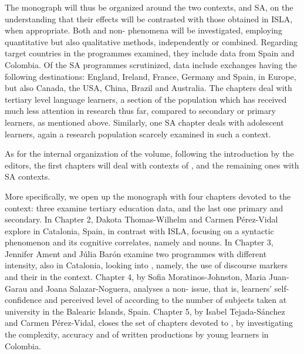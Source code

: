 \documentclass[output=paper]{langsci/langscibook}
\begin{document}
The monograph will thus be organized around the two contexts,  and SA, on the understanding that their effects will be contrasted with those obtained in ISLA, when appropriate. Both  and non- phenomena will be investigated, employing quantitative but also qualitative methods, independently or combined. Regarding target countries in the  programmes examined, they include data from Spain and Colombia. Of the SA programmes scrutinized, data include exchanges having the following destinations: England, Ireland, France, Germany and Spain, in Europe, but also Canada, the USA, China, Brazil and Australia. The  chapters deal with tertiary level language learners, a section of the population which has received much less attention in research thus far, compared to secondary or primary learners, as mentioned above. Similarly, one SA chapter deals with adolescent learners, again a research population scarcely examined in such a context.

\largerpage
As for the internal organization of the volume, following the introduction by the editors, the first chapters will deal with  contexts of , and the remaining ones with SA contexts. 


More specifically, we open up the monograph with four chapters devoted to the  context: three examine tertiary education data, and the last one primary and secondary. In Chapter 2, Dakota Thomas-Wilhelm and Carmen Pérez-Vidal explore  in Catalonia, Spain, in contrast with ISLA, focusing on a syntactic phenomenon and its cognitive correlates, namely   and  nouns. In Chapter 3, Jennifer Ament and Júlia Barón examine two  programmes with different intensity, also in Catalonia, looking into , namely, the use of  discourse markers and their  in the  context. Chapter 4, by Sofia Moratinos-Johnston, Maria Juan-Garau and Joana Salazar-Noguera, analyses a non- issue, that is, learners’  self-confidence and perceived level of  according to the number of  subjects taken at university in the Balearic Islands, Spain. Chapter 5, by Isabel Tejada-Sánchez and Carmen Pérez-Vidal, closes the set of chapters devoted to , by investigating the complexity, accuracy and  of written productions by young   learners in Colombia.
\end{document}
